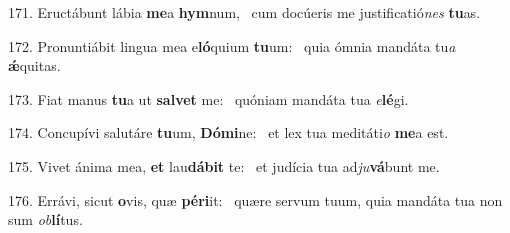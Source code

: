 171. Eructábunt lábia \textbf{me}a \textbf{hym}num, \ast\  cum docúeris me justificatió\textit{nes} \textbf{tu}as.\

172. Pronuntiábit lingua mea e\textbf{ló}quium \textbf{tu}um: \ast\  quia ómnia mandáta tu\textit{a} \textbf{ǽ}quitas.\

173. Fiat manus \textbf{tu}a ut \textbf{sal}\textbf{vet} me: \ast\  quóniam mandáta tua \textit{e}\textbf{lé}gi.\

174. Concupívi salutáre \textbf{tu}um, \textbf{Dó}\textbf{mi}ne: \ast\  et lex tua meditáti\textit{o} \textbf{me}a est.\

175. Vivet ánima mea, \textbf{et} lau\textbf{dá}\textbf{bit} te: \ast\  et judícia tua ad\textit{ju}\textbf{vá}bunt me.\

176. Errávi, sicut \textbf{o}vis, quæ \textbf{pér}\textbf{i}it: \ast\  quære servum tuum, quia mandáta tua non sum \textit{ob}\textbf{lí}tus.\

